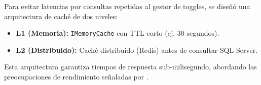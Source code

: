 Para evitar latencias por consultas repetidas al gestor de toggles, se diseñó una arquitectura de caché de dos niveles:

\begin{itemize}
    \item \textbf{L1 (Memoria):} \texttt{IMemoryCache} con TTL corto (ej. 30 segundos).
    \item \textbf{L2 (Distribuido):} Caché distribuido (Redis) antes de consultar SQL Server.
\end{itemize}

Esta arquitectura garantiza tiempos de respuesta sub-milisegundo, abordando las preocupaciones de rendimiento señaladas por \cite{sharma2024complexity}.
